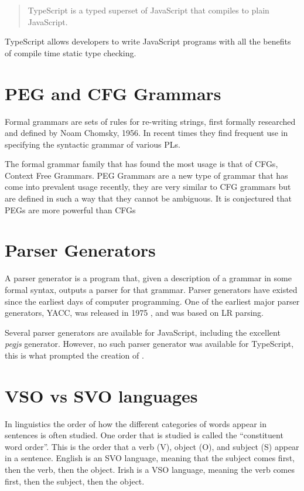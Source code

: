 \begin{quote}
TypeScript is a typed superset of JavaScript that compiles to plain JavaScript.\cite{microsoftts}
\end{quote}

TypeScript allows developers to write JavaScript programs with all the benefits of compile time static type checking.

\section{PEG and CFG Grammars}

Formal grammars are sets of rules for re-writing strings, first formally researched and defined by Noam Chomsky, 1956\cite{chomskypaper}. In recent times they find frequent use in specifying the syntactic grammar of various PLs.

The formal grammar family that has found the most usage is that of CFGs, Context Free Grammars. PEG Grammars are a new type of grammar that has come into prevalent usage recently, they are very similar to CFG grammars but are defined in such a way that they cannot be ambiguous. It is conjectured that PEGs are more powerful than CFGs\cite{pegconjecture}

\section{Parser Generators}

A parser generator is a program that, given a description of a grammar in some formal syntax, outputs a parser for that grammar. Parser generators have existed since the earliest days of computer programming. One of the earliest major parser generators, YACC, was released in 1975 \cite{yacc}, and was based on LR parsing.

Several parser generators are available for JavaScript, including the excellent \emph{pegjs} generator. However, no such parser generator was available for TypeScript, this is what prompted the creation of \tsPEG{}.

\section{VSO vs SVO languages}\label{vsosvo}

In linguistics the order of how the different categories of words appear in sentences is often studied. One order that is studied is called the ``constituent word order''. This is the order that a verb (V), object (O), and subject (S) appear in a sentence\cite{wordorder}.
English is an SVO language, meaning that the subject comes first, then the verb, then the object. Irish is a VSO language, meaning the verb comes first, then the subject, then the object.
